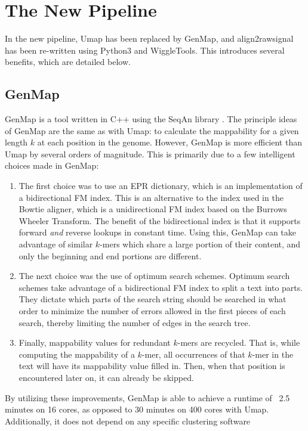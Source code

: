 \documentclass[a4paper]{article}
\begin{document}
  \section{The New Pipeline}
  In the new pipeline, Umap has been replaced by GenMap, and align2rawsignal has been re-written using Python3 and WiggleTools.
  This introduces several benefits, which are detailed below.

    \subsection{GenMap}
    GenMap is a tool written in C++ using the SeqAn library \cite{pockrandt_genmap:_2019}. The principle ideas of GenMap are the same as with Umap:
    to calculate the mappability for a given length $k$ at each position in the genome. However, GenMap is more efficient than
    Umap by several orders of magnitude. This is primarily due to a few intelligent choices made in GenMap:
    \begin{enumerate}
      \item The first choice was to use an EPR dictionary, which is an implementation of a bidirectional FM index.
            This is an alternative to the index used in the Bowtie aligner, which is a unidirectional FM index based on
            the Burrows Wheeler Transform. The benefit of the bidirectional index is that it supports forward \textit{and}
            reverse lookups in constant time. Using this, GenMap can take advantage of similar $k$-mers which share a large
            portion of their content, and only the beginning and end portions are different.
      \item The next choice was the use of optimum search schemes. Optimum search schemes take advantage of a bidirectional
            FM index to split a text into parts. They dictate which parts of the search string should be searched in what order
            to minimize the number of errors allowed in the first pieces of each search, thereby limiting the number of edges
            in the search tree.
      \item Finally, mappability values for redundant $k$-mers are recycled. That is, while computing the mappability of
            a $k$-mer, all occurrences of that $k$-mer in the text will have its mappability value filled in. Then, when
            that position is encountered later on, it can already be skipped.
    \end{enumerate}
    By utilizing these improvements, GenMap is able to achieve a runtime of ~2.5 minutes on
    16 cores, as opposed to 30 minutes on 400 cores with Umap. Additionally, it does not depend on any specific clustering software
\end{document}
